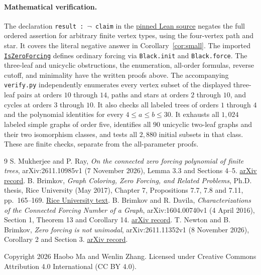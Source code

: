 \documentclass[11pt]{article}
\begin{document}
\paragraph{Mathematical verification.}
The declaration \texttt{result : $\neg$ claim} in the
\href{https://github.com/the-omega-institute/trureturing/blob/a165df4cad5a5538260a4e40d6b865a3db48795d/D5/S3/Combinatorics/Graph/ZeroForcing/ConnectedForcingCrossingRefutation.lean}{pinned Lean source}
negates the full ordered assertion for arbitrary finite vertex types,
using the four-vertex path and star. It covers the literal negative answer
in Corollary~\ref{cor:small}. The imported
\href{https://github.com/the-omega-institute/trureturing/blob/a165df4cad5a5538260a4e40d6b865a3db48795d/D5/S3/Combinatorics/GeneralizedPetersen/ZeroForcingThree.lean}{\texttt{IsZeroForcing}}
defines ordinary forcing via \texttt{Black.init} and \texttt{Black.force}.
The three-leaf and unicyclic obstructions, the enumeration,
all-order formulas, reverse cutoff, and minimality have the written proofs
above. The accompanying \texttt{verify.py} independently enumerates every
vertex subset of the displayed three-leaf pairs at orders $10$ through
$14$, paths and stars at orders $2$ through $10$, and cycles at orders
$3$ through $10$. It also checks all labeled trees of orders $1$ through
$4$ and the polynomial identities for every $4\leq a\leq b\leq30$.
It exhausts all $1{,}024$ labeled simple graphs of order five, identifies
all $90$ unicyclic two-leaf graphs and their two isomorphism classes,
and tests all $2{,}880$ initial subsets in that class.
These are finite checks, separate from the all-parameter proofs.

\begin{thebibliography}{9}\small
{} S. Mukherjee and P. Ray,
\emph{On the connected zero forcing polynomial of finite trees},
arXiv:2611.10985v1 (7 November 2026), Lemma 3.3 and Sections 4--5.
\href{https://arxiv.org/abs/2611.10985v1}{arXiv record}.
 B. Brimkov, \emph{Graph Coloring, Zero Forcing, and Related
Problems}, Ph.D. thesis, Rice University (May 2017), Chapter 7,
Propositions 7.7, 7.8 and 7.11, pp.~165--169.
\href{https://repository.rice.edu/server/api/core/bitstreams/c29c77d5-534a-4c5d-bd83-09121784af53/content}{Rice University text}.
 B. Brimkov and R. Davila,
\emph{Characterizations of the Connected Forcing Number of a Graph},
arXiv:1604.00740v1 (4 April 2016), Section 1, Theorem 13 and Corollary 14.
\href{https://arxiv.org/abs/1604.00740v1}{arXiv record}.
 T. Newton and B. Brimkov,
\emph{Zero forcing is not unimodal}, arXiv:2611.11352v1
(8 November 2026), Corollary 2 and Section 3.
\href{https://arxiv.org/abs/2611.11352v1}{arXiv record}.
\end{thebibliography}
\smallskip
\noindent\small Copyright 2026 Haobo Ma and Wenlin Zhang.
Licensed under Creative Commons Attribution 4.0 International (CC BY 4.0).
\end{document}
